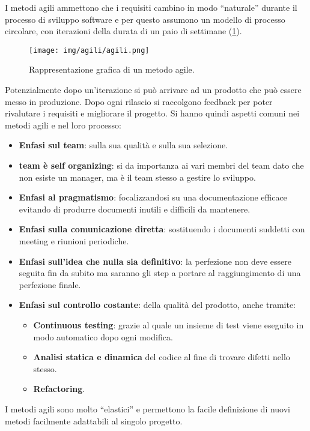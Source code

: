 I metodi agili ammettono che i requisiti cambino in modo “naturale” durante il
processo di sviluppo software e per questo assumono un modello di processo
circolare, con iterazioni della durata di un paio di settimane (\ref{fig:agili}).
\begin{figure}[!ht]
      \centering
      \texttt{[image: img/agili/agili.png]}
      \caption{Rappresentazione grafica di un metodo agile.}
      \label{fig:agili}
\end{figure}
Potenzialmente dopo un'iterazione si può arrivare ad un prodotto che può essere
messo in produzione. Dopo ogni rilascio si raccolgono feedback per poter rivalutare
i requisiti e migliorare il progetto. Si hanno quindi aspetti comuni nei metodi
agili e nel loro processo:
\begin{itemize}
      \item \textbf{Enfasi sul team}: sulla sua qualità e sulla sua selezione.
      \item \textbf{team è self organizing}: si da importanza ai vari membri
            del team dato che non esiste un manager, ma è il team stesso a
            gestire lo sviluppo.
      \item \textbf{Enfasi al pragmatismo}: focalizzandosi su una documentazione
            efficace evitando di produrre documenti inutili e difficili da
            mantenere.
      \item \textbf{Enfasi sulla comunicazione diretta}: sostituendo i documenti
            suddetti con meeting e riunioni periodiche.
      \item \textbf{Enfasi sull'idea che nulla sia definitivo}: la perfezione non
            deve essere seguita fin da subito ma saranno gli step a portare al
            raggiungimento di una perfezione finale.
      \item \textbf{Enfasi sul controllo costante}: della qualità del prodotto,
            anche tramite:
            \begin{itemize}
                  \item \textbf{Continuous testing}: grazie al quale un insieme
                        di test viene eseguito in modo automatico dopo ogni modifica.
                  \item \textbf{Analisi statica e dinamica} del codice al fine
                        di trovare difetti nello stesso.
                  \item \textbf{Refactoring}.
            \end{itemize}
\end{itemize}
I metodi agili sono molto “elastici” e permettono la facile definizione di nuovi
metodi facilmente adattabili al singolo progetto.
